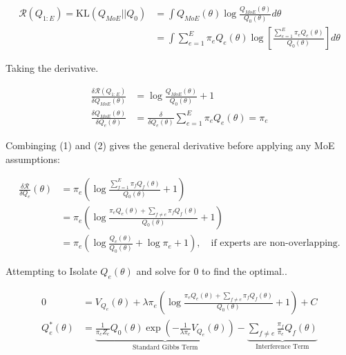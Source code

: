 \documentclass[11pt,a4paper]{article}
\begin{document}
\begin{align*}
    \mathcal{R}(Q_{1:E}) = \text{KL}(Q_{MoE} || Q_0) & = \int Q_{MoE}(\theta) \log \frac{Q_{MoE}(\theta)}{Q_0(\theta)} d\theta                                              \\
                                                     & = \int \sum_{e=1}^E \pi_e Q_e(\theta) \log \left [ \frac{\sum_{e=1}^E \pi_e Q_e(\theta)}{Q_0(\theta)} \right]d\theta
\end{align*}


Taking the derivative.

\begin{align}
    \frac{\delta\mathcal{R}(Q_{1:E})}{\delta Q_{MoE}(\theta)} & = \log \frac{Q_{MoE}(\theta)}{Q_0(\theta)} + 1                                 \\
    \frac{\delta Q_{MoE}(\theta)}{\delta Q_{e}(\theta)}       & = \frac{\delta}{{\delta Q_{e}(\theta)}} \sum_{e=1}^E \pi_e Q_e(\theta) = \pi_e
\end{align}


Combinging (1) and (2) gives the general derivative before applying any MoE assumptions:

\begin{align*}
    \frac{\delta \mathcal{R}}{\delta Q_e}(\theta)
     & = \pi_e \left( \log \frac{\sum_{f=1}^E \pi_f Q_f(\theta)}{Q_0(\theta)} + 1 \right)                        \\
     & = \pi_e \left( \log \frac{\pi_e Q_e(\theta) + \sum_{f \neq e} \pi_f Q_f(\theta)}{Q_0(\theta)} + 1 \right) \\
     & = \pi_e \left( \log \frac{Q_e(\theta)}{Q_0(\theta)} + \log \pi_e + 1 \right),
    \quad \text{if experts are non-overlapping.}
\end{align*}

Attempting to Isolate $Q_e(\theta)$ and solve for 0 to find the optimal..

\begin{align*}
    0             & = V_{Q_e}(\theta) + \lambda \pi_e \left( \log \frac{\pi_e Q_e(\theta) + \sum_{f \neq e} \pi_f Q_f(\theta)}{Q_0(\theta)} + 1 \right) + C                                                                                            \\
    Q_e^*(\theta) & = \underbrace{\frac{1}{\pi_e Z_e} Q_0(\theta) \exp \left( -\frac{1}{\lambda \pi_e} V_{Q_e}(\theta) \right)}_{\text{Standard Gibbs Term}} - \underbrace{\sum_{f \neq e} \frac{\pi_f}{\pi_e} Q_f(\theta)}_{\text{Interference Term}}
\end{align*}
\end{document}
